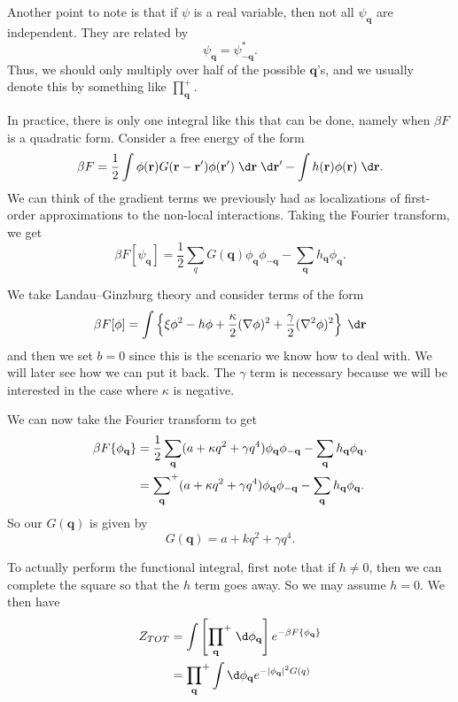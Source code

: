 \documentclass[a4paper]{article}
\newcommand\splus{\!{\vphantom{\prod}}^+}
\begin{document}
Another point to note is that if $\psi$ is a real variable, then not all $\psi_\mathbf{q}$ are independent. They are related by
\[
  \psi_\mathbf{q} = \psi_{-\mathbf{q}}^*.
\]
Thus, we should only multiply over half of the possible $\mathbf{q}$'s, and we usually denote this by something like $\prod^+_{\mathbf{q}}$.

In practice, there is only one integral like this that can be done, namely when $\beta F$ is a quadratic form. Consider a free energy of the form
\[
  \beta F = \frac{1}{2} \int \phi(\mathbf{r}) G(\mathbf{r} - \mathbf{r}') \phi(\mathbf{r}')\;\d \mathbf{r}\;\d \mathbf{r}' - \int h(\mathbf{r}) \phi(\mathbf{r})\;\d \mathbf{r}.
\]
We can think of the gradient terms we previously had as localizations of first-order approximations to the non-local interactions. Taking the Fourier transform, we get
\[
  \beta F[\psi_\mathbf{q}] = \frac{1}{2} \sum_q G(\mathbf{q}) \phi_\mathbf{q} \phi_{-\mathbf{q}} - \sum_\mathbf{q} h_\mathbf{q} \phi_\mathbf{q}.
\]
\begin{eg}
  We take Landau--Ginzburg theory and consider terms of the form
  \[
    \beta F[\phi] = \int \left\{\xi \phi^2 - h \phi + \frac{\kappa}{2} (\nabla \phi)^2 + \frac{\gamma}{2} (\nabla^2 \phi)^2\right\}\;\d \mathbf{r}
  \]
  and then we set $b = 0$ since this is the scenario we know how to deal with. We will later see how we can put it back. The $\gamma$ term is necessary because we will be interested in the case where $\kappa$ is negative.

  We can now take the Fourier transform to get
  \begin{align*}
    \beta F \{\phi_\mathbf{q}\} &= \frac{1}{2} \sum_\mathbf{q} (a + \kappa q^2 + \gamma q^4) \phi_\mathbf{q} \phi_{-\mathbf{q}} - \sum_\mathbf{q} h_\mathbf{q} \phi_\mathbf{q}.\\
    &= \sum_\mathbf{q}\splus (a + \kappa q^2 + \gamma q^4) \phi_\mathbf{q} \phi_{-\mathbf{q}} - \sum_\mathbf{q} h_\mathbf{q} \phi_\mathbf{q}.
  \end{align*}
  So our $G(\mathbf{q})$ is given by
  \[
    G(\mathbf{q}) = a + k q^2 + \gamma q^4.
  \]
\end{eg}
To actually perform the functional integral, first note that if $h \not= 0$, then we can complete the square so that the $h$ term goes away. So we may assume $h = 0$. We then have
\begin{align*}
  Z_{TOT} &= \int \left[ \prod_{\mathbf{q}}\splus \;\d \phi_\mathbf{q}\right] e^{-\beta F\{\phi_\mathbf{q}\}}\\
  &= \prod_\mathbf{q}\splus \int \d \phi_\mathbf{q} e^{-|\phi_\mathbf{q}|^2 G(q)}
\end{align*}
\end{document}
